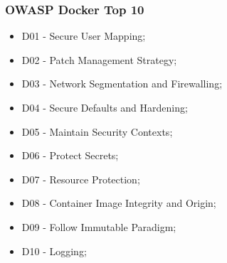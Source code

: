 
\begin{frame}
	\frametitle{OWASP Docker Top 10}
	\begin{itemize}
		\item D01 - Secure User Mapping;
		\item D02 - Patch Management Strategy;
		\item D03 - Network Segmentation and Firewalling;
		\item D04 - Secure Defaults and Hardening;
		\item D05 - Maintain Security Contexts;
		\item D06 - Protect Secrets;
		\item D07 - Resource Protection;
		\item D08 - Container Image Integrity and Origin;
		\item D09 - Follow Immutable Paradigm;
		\item D10 - Logging;
	\end{itemize}
\end{frame}

